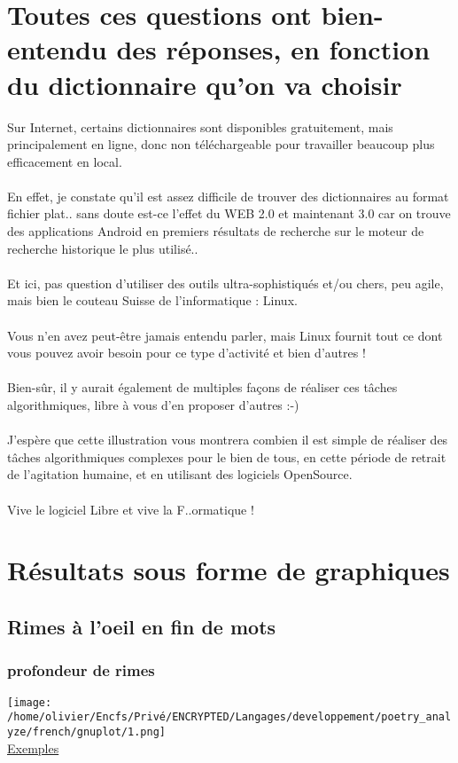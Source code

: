 \documentclass[french]{article}
\begin{document}
\section{Toutes ces questions ont bien-entendu des réponses, en fonction du dictionnaire qu'on va choisir}
Sur Internet, certains dictionnaires sont disponibles gratuitement, mais principalement en ligne, donc non téléchargeable pour travailler beaucoup plus efficacement en local.\\
\\
En effet, je constate qu'il est assez difficile de trouver des dictionnaires au format fichier plat.. sans doute est-ce l'effet du WEB 2.0 et maintenant 3.0 car on trouve des applications Android en premiers résultats de recherche sur le moteur de recherche historique le plus utilisé..\\
\\
Et ici, pas question d'utiliser des outils ultra-sophistiqués et/ou chers, peu agile, mais bien le couteau Suisse de l'informatique : Linux.\\
\\
Vous n'en avez peut-être jamais entendu parler, mais Linux fournit tout ce dont vous pouvez avoir besoin pour ce type d'activité et bien d'autres !\\
\\
Bien-sûr, il y aurait également de multiples façons de réaliser ces tâches algorithmiques, libre à vous d'en proposer d'autres :-)\\
\\
J'espère que cette illustration vous montrera combien il est simple de réaliser des tâches algorithmiques complexes pour le bien de tous, en cette période de retrait de l'agitation humaine, et en utilisant des logiciels OpenSource.\\
\\
Vive le logiciel Libre et vive la F..ormatique !\\
\newpage
\section{Résultats sous forme de graphiques}
\subsection{Rimes à l'oeil en fin de mots}
\subsubsection{profondeur de rimes}
\texttt{[image: /home/olivier/Encfs/Privé/ENCRYPTED/Langages/developpement/poetry\_analyze/french/gnuplot/1.png]}\\
\underline{Exemples}\\
\end{document}
